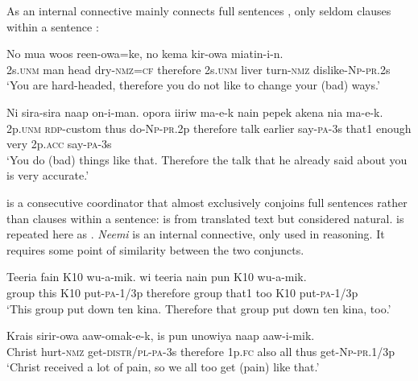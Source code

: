  
As an internal connective  mainly connects full sentences , only seldom clauses within a sentence :

\ea%
\label{ex:8:x1410}
\gll No  mua  woos  reen-owa=ke,    no  kema  kir-owa miatin-i-n.\\
2s.\textsc{unm} man  head  dry-\textsc{nmz}=\textsc{cf} therefore  2s.\textsc{unm} liver turn-\textsc{nmz} dislike-\textsc{Np}-\textsc{pr}.2s\\
\glt`You are hard-headed, therefore you do not like to change your (bad) ways.'
\z


\ea%
\label{ex:8:x1411}
\gll Ni  sira-sira  naap  on-i-man.    opora  iiriw ma-e-k  nain  pepek  akena  nia  ma-e-k.\\
2p.\textsc{unm} \textsc{rdp}-custom  thus  do-\textsc{Np}-\textsc{pr}.2p  therefore  talk  earlier say-\textsc{pa}-3s  that1  enough  very  2p.\textsc{acc} say-\textsc{pa}-3s\\
\glt`You do (bad) things like that. Therefore the talk that he already said about you is very accurate.'
\z


  is a consecutive coordinator that almost exclusively conjoins full sentences rather than clauses within a sentence:  is from translated text but considered natural.  is repeated here as . \textit{Neemi} is an internal connective, only used in reasoning. It requires some point of similarity between the two conjuncts.

\ea%
\label{ex:8:x1904}
\gll Teeria  fain  K10  wu-a-mik.    wi  teeria  nain  pun K10  wu-a-mik.\\
group  this  K10  put-\textsc{pa}-1/3p  therefore  group  that1  too K10  put-\textsc{pa}-1/3p\\
\glt`This group put down ten kina. Therefore that group put down ten kina, too.'
\z
{}


\ea%
\label{ex:8:x1409}
\gll Krais  sirir-owa  aaw-omak-e-k,    is  pun unowiya  naap  aaw-i-mik.\\
Christ  hurt-\textsc{nmz} get-\textsc{distr}/\textsc{pl}-\textsc{pa}-3s  therefore  1p.\textsc{fc} also all  thus  get-\textsc{Np}-\textsc{pr}.1/3p\\
\glt`Christ received a lot of pain, so we all too get (pain) like that.'
\z


